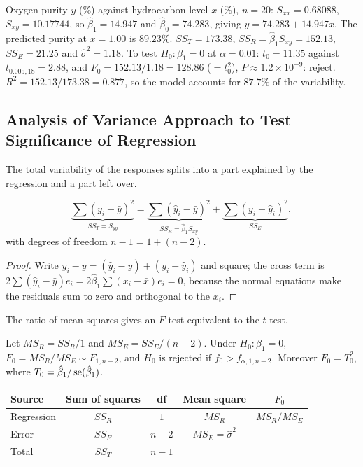\begin{example}
Oxygen purity $y$ (\%) against hydrocarbon level $x$ (\%), $n=20$: $S_{xx}=0.68088$, $S_{xy}=10.17744$, so $\hat\beta_1=14.947$ and $\hat\beta_0=74.283$, giving $\hat{y}=74.283+14.947x$. The predicted purity at $x=1.00$ is $89.23\%$. $SS_T=173.38$, $SS_R=\hat\beta_1S_{xy}=152.13$, $SS_E=21.25$ and $\hat\sigma^2=1.18$. To test $H_0:\beta_1=0$ at $\alpha=0.01$: $t_0=11.35$ against $t_{0.005,18}=2.88$, and $F_0=152.13/1.18=128.86$ ($=t_0^2$), $P\approx1.2\times10^{-9}$: reject. $R^2=152.13/173.38=0.877$, so the model accounts for $87.7\%$ of the variability.
\end{example}

\subsection{Analysis of Variance Approach to Test Significance of Regression}

The total variability of the responses splits into a part explained by the regression and a part left over.

\begin{theorem}\label{thm:anova-reg}
\[ \underbrace{\sum(y_i-\bar{y})^2}_{SS_T=S_{yy}}=\underbrace{\sum(\hat{y}_i-\bar{y})^2}_{SS_R=\hat\beta_1S_{xy}}+\underbrace{\sum(y_i-\hat{y}_i)^2}_{SS_E}, \]
with degrees of freedom $n-1=1+(n-2)$.
\end{theorem}

\begin{proof}
Write $y_i-\bar{y}=(\hat{y}_i-\bar{y})+(y_i-\hat{y}_i)$ and square; the cross term is $2\sum(\hat{y}_i-\bar{y})e_i=2\hat\beta_1\sum(x_i-\bar{x})e_i=0$, because the normal equations make the residuals sum to zero and orthogonal to the $x_i$.
\end{proof}

The ratio of mean squares gives an $F$ test equivalent to the $t$-test.

\begin{theorem}\label{thm:regF}
Let $MS_R=SS_R/1$ and $MS_E=SS_E/(n-2)$. Under $H_0:\beta_1=0$, $F_0=MS_R/MS_E\sim F_{1,n-2}$, and $H_0$ is rejected if $f_0>f_{\alpha,1,n-2}$. Moreover $F_0=T_0^2$, where $T_0=\hat\beta_1/\operatorname{se}(\hat\beta_1)$.
\end{theorem}

\begin{center}
\begin{tabular}{lcccc}
\toprule
Source & Sum of squares & df & Mean square & $F_0$ \\
\midrule
Regression & $SS_R$ & $1$ & $MS_R$ & $MS_R/MS_E$ \\
Error & $SS_E$ & $n-2$ & $MS_E=\hat\sigma^2$ & \\
Total & $SS_T$ & $n-1$ & & \\
\bottomrule
\end{tabular}
\end{center}

